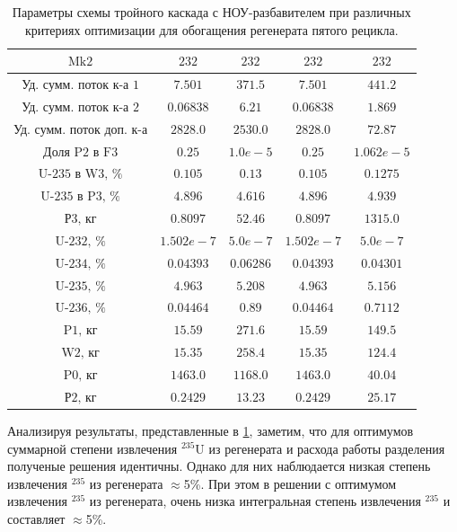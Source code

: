 \begin{table}
\begin{tabular}{ccccc}
        $\text{Mk2}$ & $232$ & $232$ & $232$ & $232$\\ \hline
        $\text{Уд. сумм. поток к-а 1}$ & $7.501$ & $371.5$ & $7.501$ & $441.2$\\ \hline
        $\text{Уд. сумм. поток к-а 2}$ & $0.06838$ & $6.21$ & $0.06838$ & $1.869$\\ \hline
        $\text{Уд. сумм. поток доп. к-а}$ & $2828.0$ & $2530.0$ & $2828.0$ & $72.87$\\ \hline
        $\text{Доля P2 в F3}$ & $0.25$ & $1.0e-5$ & $0.25$ & $1.062e-5$\\ \hline
        $\text{U-235 в W3, \%}$ & $0.105$ & $0.13$ & $0.105$ & $0.1275$\\ \hline
        $\text{U-235 в P3, \%}$ & $4.896$ & $4.616$ & $4.896$ & $4.939$\\ \hline
        $\text{Р3, кг}$ & $0.8097$ & $52.46$ & $0.8097$ & $1315.0$\\ \hline
        $\text{U-232, \%}$ & $1.502e-7$ & $5.0e-7$ & $1.502e-7$ & $5.0e-7$\\ \hline
        $\text{U-234, \%}$ & $0.04393$ & $0.06286$ & $0.04393$ & $0.04301$\\ \hline
        $\text{U-235, \%}$ & $4.963$ & $5.208$ & $4.963$ & $5.156$\\ \hline
        $\text{U-236, \%}$ & $0.04464$ & $0.89$ & $0.04464$ & $0.7112$\\ \hline
        $\text{P1, кг}$ & $15.59$ & $271.6$ & $15.59$ & $149.5$\\ \hline
        $\text{W2, кг}$ & $15.35$ & $258.4$ & $15.35$ & $124.4$\\ \hline
        $\text{P0, кг}$ & $1463.0$ & $1168.0$ & $1463.0$ & $40.04$\\ \hline
        $\text{Р2, кг}$ & $0.2429$ & $13.23$ & $0.2429$ & $25.17$\\ \hline
        \end{tabular}
\caption{Параметры схемы тройного каскада с НОУ-разбавителем при различных критериях оптимизации для обогащения регенерата пятого рецикла.{\label{3opt5}}}
\end{table}


Анализируя результаты, представленные в \ref{3opt5}, заметим, что для оптимумов суммарной степени извлечения $^{235}$U из регенерата и расхода работы разделения полученые решения идентичны. Однако для них наблюдается низкая степень извлечения $^{235}$ из регенерата $\approx$5\%. При этом в решении с оптимумом извлечения $^{235}$ из регенерата, очень низка интегральная степень извлечения $^{235}$ и составляет $\approx$5\%. 



